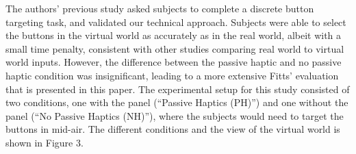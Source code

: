 \documentclass[]{aiaa-tc}%
\begin{document}
The authors' previous study asked subjects to complete a discrete button targeting task, and validated our technical approach\cite{joyce_rapidly_2015}.
Subjects were able to select the buttons in the virtual world as accurately as in the real world, albeit with a small time penalty, consistent with other studies comparing real world to virtual world inputs\cite{liu_comparing_2009}.
However, the difference between the passive haptic and no passive haptic condition was insignificant, leading to a more extensive Fitts' evaluation that is presented in this paper.
The experimental setup for this study consisted of two conditions, one with the panel (``Passive Haptics (PH)'') and one without the panel (``No Passive Haptics (NH)''), where the subjects would need to target the buttons in mid-air.
The different conditions and the view of the virtual world is shown in Figure 3.
\end{document}
